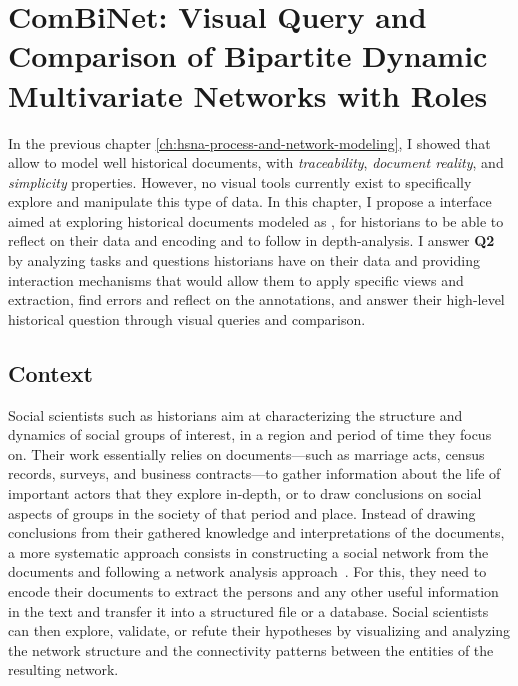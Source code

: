 \chapter{ComBiNet: Visual Query and Comparison of Bipartite Dynamic Multivariate Networks with Roles}\label{ch:combinet}
\minitoc

\newcommand{\combinet}{ComBiNet\xspace}

In the previous chapter \autoref{ch:hsna-process-and-network-modeling}, I showed that \modelplural allow to model well historical documents, with \emph{traceability}, \emph{document reality}, and \emph{simplicity} properties.
However, no visual tools currently exist to specifically explore and manipulate this type of data.
In this chapter, I propose a \va interface aimed at exploring historical documents modeled as \modelplural, for historians to be able to reflect on their data and encoding and to follow in depth-analysis.
I answer \textbf{Q2} by analyzing tasks and questions historians have on their data and providing interaction mechanisms that would allow them to apply specific views and extraction, find errors and reflect on the annotations, and answer their high-level historical question through visual queries and comparison.


\section{Context}

Social scientists such as historians aim at characterizing the structure and dynamics of social groups of interest, in a region and period of time they focus on\cite{tilly1984retrieving}.
Their work essentially relies on documents---such as marriage acts, census records, surveys, and business contracts---to gather information about the life of important actors that they explore in-depth, or to draw conclusions on social aspects of groups in the society of that period and place.
Instead of drawing conclusions from their gathered knowledge and interpretations of the documents, a more systematic approach consists in constructing a social network from the documents and following a network analysis approach~\cite{wetherellHistoricalSocialNetwork1998}.
For this, they need to encode their documents to extract the persons and any other useful information in the text and transfer it into a structured file or a database.
Social scientists can then explore, validate, or refute their hypotheses by visualizing and analyzing the network structure and the connectivity patterns between the entities of the resulting network.

